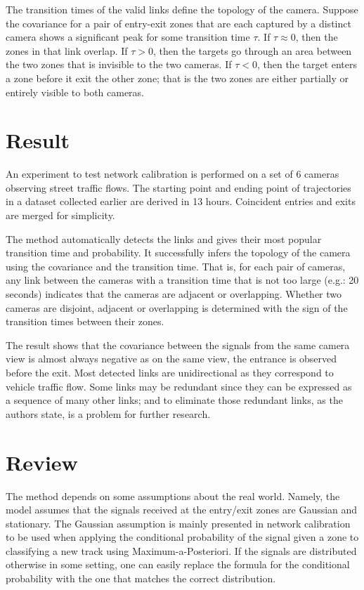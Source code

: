\documentclass[10pt]{article}
\begin{document}
The transition times of the valid links define the topology of the camera. Suppose the covariance for a pair of entry-exit zones that are each captured by a distinct camera shows a significant peak for some transition time $\tau$. If $\tau \approx 0$, then the zones in that link overlap. If $\tau > 0$, then the targets go through an area between the two zones that is invisible to the two cameras. If $\tau < 0$, then the target enters a zone before it exit the other zone; that is the two zones are either partially or entirely visible to both cameras. 

\section{Result}
An experiment to test network calibration is performed on a set of 6 cameras observing street traffic flows. The starting point and ending point of trajectories in a dataset collected earlier are derived in 13 hours. Coincident entries and exits are merged for simplicity. 

The method automatically detects the links and gives their most popular transition time and probability. It successfully infers the topology of the camera using the covariance and the transition time. That is, for each pair of cameras, any link between the cameras with a transition time that is not too large (e.g.: 20 seconds) indicates that the cameras are adjacent or overlapping. Whether two cameras are disjoint, adjacent or overlapping is determined with the sign of the transition times between their zones. 

The result shows that the covariance between the signals from the same camera view is almost always negative as on the same view, the entrance is observed before the exit. Most detected links are unidirectional as they correspond to vehicle traffic flow. Some links may be redundant since they can be expressed as a sequence of many other links; and to eliminate those redundant links, as the authors state, is a problem for further research. 

\section{Review}
The method depends on some assumptions about the real world. Namely, the model assumes that the signals received at the entry/exit zones are Gaussian and stationary. The Gaussian assumption is mainly presented in network calibration to be used when applying the conditional probability of the signal given a zone to classifying a new track using Maximum-a-Posteriori. If the signals are distributed otherwise in some setting, one can easily replace the formula for the conditional probability with the one that matches the correct distribution.
\end{document}
